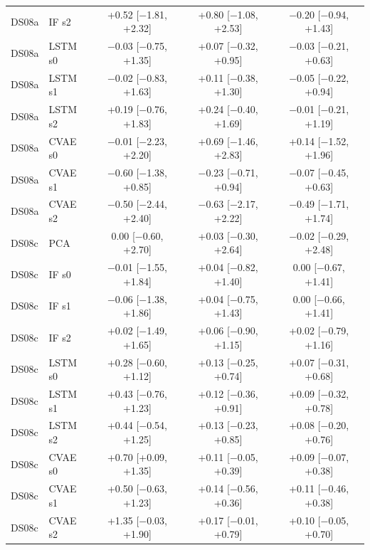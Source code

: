 \documentclass[10pt]{article}
\begin{document}
{\begin{longtable}{llccc}
DS08a & IF s2 & +0.52 [−1.81, +2.32] & +0.80 [−1.08, +2.53] & −0.20 [−0.94, +1.43] \\
DS08a & LSTM s0 & −0.03 [−0.75, +1.35] & +0.07 [−0.32, +0.95] & −0.03 [−0.21, +0.63] \\
DS08a & LSTM s1 & −0.02 [−0.83, +1.63] & +0.11 [−0.38, +1.30] & −0.05 [−0.22, +0.94] \\
DS08a & LSTM s2 & +0.19 [−0.76, +1.83] & +0.24 [−0.40, +1.69] & −0.01 [−0.21, +1.19] \\
DS08a & CVAE s0 & −0.01 [−2.23, +2.20] & +0.69 [−1.46, +2.83] & +0.14 [−1.52, +1.96] \\
DS08a & CVAE s1 & −0.60 [−1.38, +0.85] & −0.23 [−0.71, +0.94] & −0.07 [−0.45, +0.63] \\
DS08a & CVAE s2 & −0.50 [−2.44, +2.40] & −0.63 [−2.17, +2.22] & −0.49 [−1.71, +1.74] \\
\midrule
DS08c & PCA & 0.00 [−0.60, +2.70] & +0.03 [−0.30, +2.64] & −0.02 [−0.29, +2.48] \\
DS08c & IF s0 & −0.01 [−1.55, +1.84] & +0.04 [−0.82, +1.40] & 0.00 [−0.67, +1.41] \\
DS08c & IF s1 & −0.06 [−1.38, +1.86] & +0.04 [−0.75, +1.43] & 0.00 [−0.66, +1.41] \\
DS08c & IF s2 & +0.02 [−1.49, +1.65] & +0.06 [−0.90, +1.15] & +0.02 [−0.79, +1.16] \\
DS08c & LSTM s0 & +0.28 [−0.60, +1.12] & +0.13 [−0.25, +0.74] & +0.07 [−0.31, +0.68] \\
DS08c & LSTM s1 & +0.43 [−0.76, +1.23] & +0.12 [−0.36, +0.91] & +0.09 [−0.32, +0.78] \\
DS08c & LSTM s2 & +0.44 [−0.54, +1.25] & +0.13 [−0.23, +0.85] & +0.08 [−0.20, +0.76] \\
DS08c & CVAE s0 & +0.70 [+0.09, +1.35] & +0.11 [−0.05, +0.39] & +0.09 [−0.07, +0.38] \\
DS08c & CVAE s1 & +0.50 [−0.63, +1.23] & +0.14 [−0.56, +0.36] & +0.11 [−0.46, +0.38] \\
DS08c & CVAE s2 & +1.35 [−0.03, +1.90] & +0.17 [−0.01, +0.79] & +0.10 [−0.05, +0.70] \\
\end{longtable}
\vspace{-0.6em}
}
\end{document}
